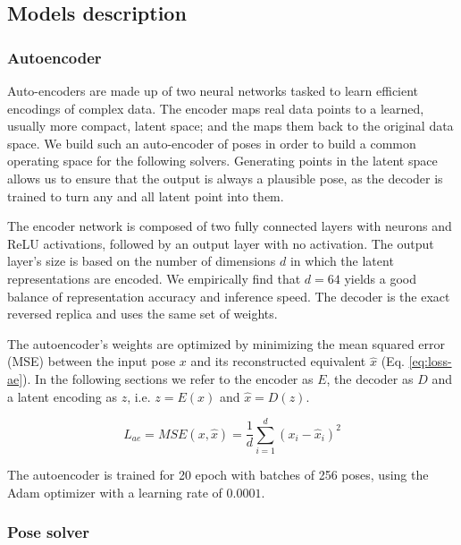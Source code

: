 \subsection{Models description}
\subsubsection{Autoencoder}
Auto-encoders are made up of two neural networks tasked to learn efficient encodings of complex data. The encoder maps real data points to a learned, usually more compact, latent space; and the  maps them back to the original data space.
We build such an auto-encoder of poses in order to build a common operating space for the following solvers. Generating points in the latent space allows us to ensure that the output is always a plausible pose, as the decoder is trained to turn any and all latent point into them.

The encoder network is composed of two fully connected layers with  neurons and ReLU \cite{relu_2010} activations, followed by an output layer with no activation. The output layer's size is based on the number of
dimensions $d$ in which the latent representations are encoded. We empirically find that $d=64$ yields a good balance of representation accuracy and inference speed. The decoder is the exact reversed replica and uses the same set of weights. 

The autoencoder's weights are optimized by minimizing the mean squared error (MSE) between the input pose $x$ and its reconstructed equivalent $\hat x$ (Eq. \ref{eq:loss-ae}). In the following sections we refer to the encoder as $E$, the decoder as $D$ and a latent encoding as $z$, i.e. $z = E(x)$ and $\hat x = D(z)$. 

\begin{equation}
    \label{eq:loss-ae}
    L_{ae} = MSE(x, \hat x) = \frac{1}{d} \sum_{i=1}^{d}(x_i - \hat x_i)^2
\end{equation}

The autoencoder is trained for 20 epoch with batches of 256 poses, using the Adam optimizer \cite{kingma_adam_2017} with a learning rate of $0.0001$.

\subsubsection{Pose solver}

